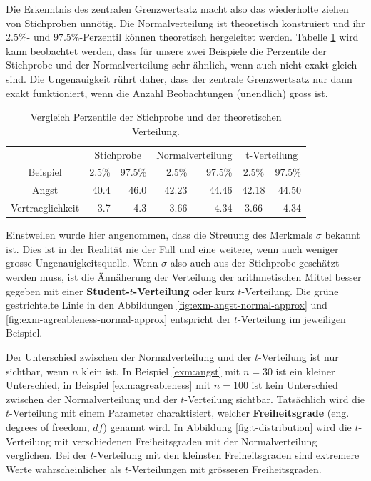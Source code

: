 \documentclass[
]{book}
\theoremstyle{definition}
\theoremstyle{definition}
\theoremstyle{definition}
\theoremstyle{definition}
\theoremstyle{remark}
\begin{document}
Die Erkenntnis des zentralen Grenzwertsatz macht also das wiederholte ziehen von Stichproben unnötig. Die Normalverteilung ist theoretisch konstruiert und ihr \(2.5\%\)- und \(97.5\%\)-Perzentil können theoretisch hergeleitet werden. Tabelle \ref{tab:quantiles-norm} wird kann beobachtet werden, dass für unsere zwei Beispiele die Perzentile der Stichprobe und der Normalverteilung sehr ähnlich, wenn auch nicht exakt gleich sind. Die Ungenauigkeit rührt daher, dass der zentrale Grenzwertsatz nur dann exakt funktioniert, wenn die Anzahl Beobachtungen (unendlich) gross ist.

\begin{table}
\centering
\caption{\label{tab:quantiles-norm}Vergleich Perzentile der Stichprobe und der theoretischen Verteilung.}
\centering
\begin{tabular}[t]{crrrrcr}
\toprule
\multicolumn{1}{c}{ } & \multicolumn{2}{c}{Stichprobe} & \multicolumn{2}{c}{Normalverteilung} & \multicolumn{2}{c}{t-Verteilung} \\
\cmidrule(l{3pt}r{3pt}){2-3} \cmidrule(l{3pt}r{3pt}){4-5} \cmidrule(l{3pt}r{3pt}){6-7}
Beispiel & 2.5\% & 97.5\% & 2.5\% & 97.5\% & 2.5\% & 97.5\%\\
\midrule
Angst & 40.4 & 46.0 & 42.23 & 44.46 & 42.18 & 44.50\\
Vertraeglichkeit & 3.7 & 4.3 & 3.66 & 4.34 & 3.66 & 4.34\\
\bottomrule
\end{tabular}
\end{table}

Einstweilen wurde hier angenommen, dass die Streuung des Merkmals \(\sigma\) bekannt ist. Dies ist in der Realität nie der Fall und eine weitere, wenn auch weniger grosse Ungenauigkeitsquelle. \label{customdef-student-verteilung}{Wenn \(\sigma\) also auch aus der Stichprobe geschätzt werden muss, ist die Ännäherung der Verteilung der arithmetischen Mittel besser gegeben mit einer \textbf{Student-\(t\)-Verteilung} oder kurz \(t\)-Verteilung.} Die grüne gestrichtelte Linie in den Abbildungen \ref{fig:exm-angst-normal-approx} und \ref{fig:exm-agreableness-normal-approx} entspricht der \(t\)-Verteilung im jeweiligen Beispiel.

Der Unterschied zwischen der Normalverteilung und der \(t\)-Verteilung ist nur sichtbar, wenn \(n\) klein ist. In Beispiel \ref{exm:angst} mit \(n = 30\) ist ein kleiner Unterschied, in Beispiel \ref{exm:agreableness} mit \(n = 100\) ist kein Unterschied zwischen der Normalverteilung und der \(t\)-Verteilung sichtbar. \label{customdef-freiheitsgrade}{Tatsächlich wird die \(t\)-Verteilung mit einem Parameter charaktisiert, welcher \textbf{Freiheitsgrade} (eng. degrees of freedom, \(df\)) genannt wird.} In Abbildung \ref{fig:t-distribution} wird die \(t\)-Verteilung mit verschiedenen Freiheitsgraden mit der Normalverteilung verglichen. Bei der \(t\)-Verteilung mit den kleinsten Freiheitsgraden sind extremere Werte wahrscheinlicher als \(t\)-Verteilungen mit grösseren Freiheitsgraden.
\end{document}
